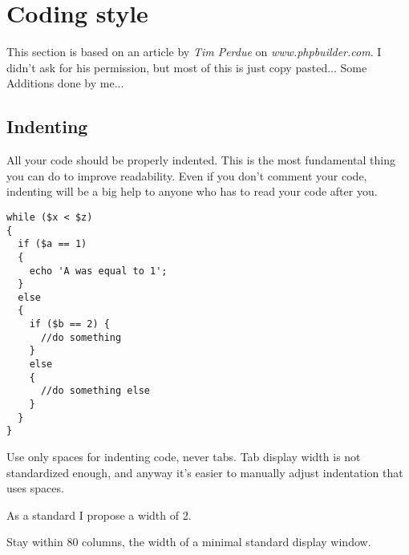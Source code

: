 

\renewcommand{\ElveInstitut}{Institut f\"{u}r Informatik und Praktische Mathematik}
\renewcommand{\ElveProf}{Prof. Dr. W.-P. de Roever}
\renewcommand{\ElveSemester}{WS 2004/05}
\renewcommand{\ElveName}{Jan Waller - PHP Gruppe 1}
\renewcommand{\ElveUebung}{P-I-T-M - Guidelines}
\lstset{language=PHP}


\thispagestyle{plain}
\tableofcontents

\section{Coding style}
    This section is based on an article by \emph{Tim Perdue} on \emph{www.phpbuilder.com}.
    I didn't ask for his permission, but most of this is just copy pasted... Some Additions done by me...

    \subsection{Indenting}
        All your code should be properly indented. This is the most fundamental thing you can do to
        improve readability. Even if you don't comment your code, indenting will be a big help to anyone
        who has to read your code after you.

        \begin{lstlisting}[stepnumber=0,frame={}]
while ($x < $z)
{
  if ($a == 1)
  {
    echo 'A was equal to 1';
  }
  else
  {
    if ($b == 2) {
      //do something
    }
    else
    {
      //do something else
    }
  }
}
        \end{lstlisting}

        Use only spaces for indenting code, never tabs.  Tab display width is not standardized enough,
        and anyway it's easier to manually adjust indentation that uses spaces.

        As a standard I propose a width of 2.

        Stay within 80 columns, the width of a minimal standard display window.

